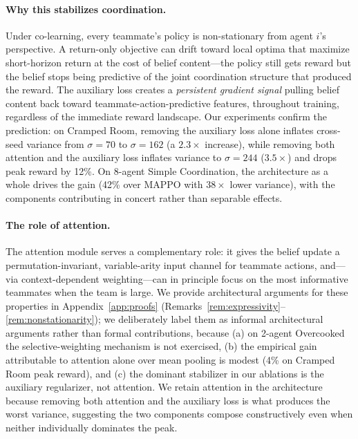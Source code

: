 \documentclass{article}
\theoremstyle{plain}
\theoremstyle{definition}
\theoremstyle{remark}
\begin{document}
\paragraph{Why this stabilizes coordination.}
Under co-learning, every teammate's policy is non-stationary from agent $i$'s perspective. A return-only objective can drift toward local optima that maximize short-horizon return at the cost of belief content---the policy still gets reward but the belief stops being predictive of the joint coordination structure that produced the reward. The auxiliary loss creates a \emph{persistent gradient signal} pulling belief content back toward teammate-action-predictive features, throughout training, regardless of the immediate reward landscape. Our experiments confirm the prediction: on Cramped Room, removing the auxiliary loss alone inflates cross-seed variance from $\sigma{=}70$ to $\sigma{=}162$ (a $2.3\times$ increase), while removing both attention and the auxiliary loss inflates variance to $\sigma{=}244$ ($3.5\times$) and drops peak reward by 12\%. On 8-agent Simple Coordination, the architecture as a whole drives the gain (42\% over MAPPO with $38\times$ lower variance), with the components contributing in concert rather than separable effects.

\paragraph{The role of attention.}
The attention module serves a complementary role: it gives the belief update a permutation-invariant, variable-arity input channel for teammate actions, and---via context-dependent weighting---can in principle focus on the most informative teammates when the team is large. We provide architectural arguments for these properties in Appendix~\ref{app:proofs} (Remarks~\ref{rem:expressivity}--\ref{rem:nonstationarity}); we deliberately label them as informal architectural arguments rather than formal contributions, because (a) on 2-agent Overcooked the selective-weighting mechanism is not exercised, (b) the empirical gain attributable to attention alone over mean pooling is modest (4\% on Cramped Room peak reward), and (c) the dominant stabilizer in our ablations is the auxiliary regularizer, not attention. We retain attention in the architecture because removing both attention and the auxiliary loss is what produces the worst variance, suggesting the two components compose constructively even when neither individually dominates the peak.
\end{document}
